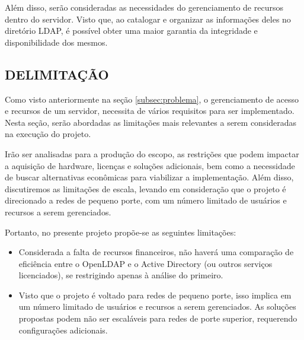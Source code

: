 Além disso, serão consideradas as necessidades do gerenciamento de recursos dentro do servidor. Visto que, ao catalogar e organizar as informações deles no diretório LDAP, é possível obter uma maior garantia da integridade e disponibilidade dos mesmos.

\subsection{DELIMITAÇÃO}
\label{subsec:delimitação}
Como visto anteriormente na seção \ref{subsec:problema}, o gerenciamento de acesso e recursos de um servidor, necessita de vários requisitos para ser implementado. Nesta seção, serão abordadas as limitações mais relevantes a serem consideradas na execução 
do projeto. 

Irão ser analisadas para a produção do escopo, as restrições que podem impactar a aquisição de hardware, licenças e soluções adicionais, bem como a necessidade de buscar alternativas econômicas para viabilizar a implementação. Além disso, discutiremos as limitações de escala, levando em consideração que o projeto é direcionado a redes de pequeno porte, com um número limitado de usuários e recursos a serem gerenciados.

Portanto, no presente projeto propõe-se as seguintes limitações:

\begin{itemize}
	\item Considerada a falta de recursos financeiros, não haverá uma comparação de eficiência entre o OpenLDAP e o Active Directory (ou outros serviços licenciados), se restrigindo apenas à análise do primeiro.
    \item Visto que o projeto é voltado para redes de pequeno porte, isso implica em um número limitado de usuários e recursos a serem gerenciados. As soluções propostas podem não ser escaláveis para redes de porte superior, requerendo configurações adicionais.
\end{itemize}

